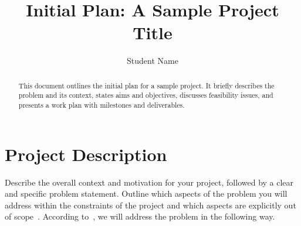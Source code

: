 \documentclass[sans,oneside,single,parskip,raggedright,numeric]{qproposal}
\title{Initial Plan: A Sample Project Title}
\author{Student Name}
\begin{document}
\maketitle

\begin{abstract}
  This document outlines the initial plan for a sample project. It briefly
  describes the problem and its context, states aims and objectives, discusses
  feasibility issues, and presents a work plan with milestones and deliverables.
\end{abstract}

%
%

\section{Project Description}

Describe the overall context and motivation for your project, followed by a
clear and specific problem statement. Outline which aspects of the problem
you will address within the constraints of the project and which aspects
are explicitly out of scope~\citep{example-paper}. According
to~\citet{example-book}, we will address the problem in the following way.

%
%
\end{document}
